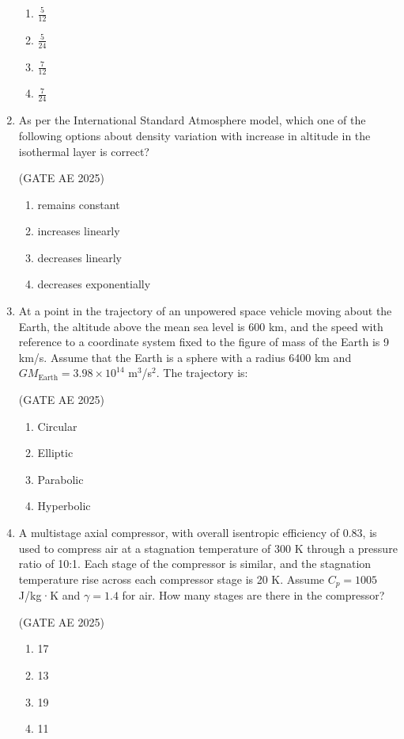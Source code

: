 \documentclass[journal,12pt,onecolumn]{IEEEtran}
\theoremstyle{remark}
\begin{document}
\begin{flushleft}
\begin{enumerate}
\begin{enumerate}
   \item $\frac{5}{12}$
    \item $\frac{5}{24}$
    \item $\frac{7}{12}$
    \item $\frac{7}{24}$
\end{enumerate}
   
\item As per the International Standard Atmosphere model, which one of the following options about density variation with increase in altitude in the isothermal layer is correct?

\hfill (GATE AE 2025)

\begin{enumerate}
 \item remains constant
 \item increases linearly
 \item decreases linearly
 \item decreases exponentially
\end{enumerate}

\item At a point in the trajectory of an unpowered space vehicle moving about the Earth, the altitude above the mean sea level is 600 km, and the speed with reference to a coordinate system fixed to the figure of mass of the Earth is 9 km/s. Assume that the Earth is a sphere with a radius 6400 km and $GM_{\text{Earth}} = 3.98 \times 10^{14}$ m$^3$/s$^2$. The trajectory is:

\hfill (GATE AE 2025)

\begin{enumerate}
\item Circular
\item Elliptic
\item Parabolic
\item Hyperbolic
\end{enumerate}
  

\item  A multistage axial compressor, with overall isentropic efficiency of 0.83, is used to compress air at a stagnation temperature of 300 K through a pressure ratio of 10:1. Each stage of the compressor is similar, and the stagnation temperature rise across each compressor stage is 20 K. Assume $C_p = 1005$ J/kg·K and $\gamma = 1.4$ for air. How many stages are there in the compressor?

\hfill (GATE AE 2025)

\begin{enumerate}
    \item 17
    \item 13
    \item 19
    \item 11
\end{enumerate}


\end{enumerate}
\end{flushleft}
\end{document}
